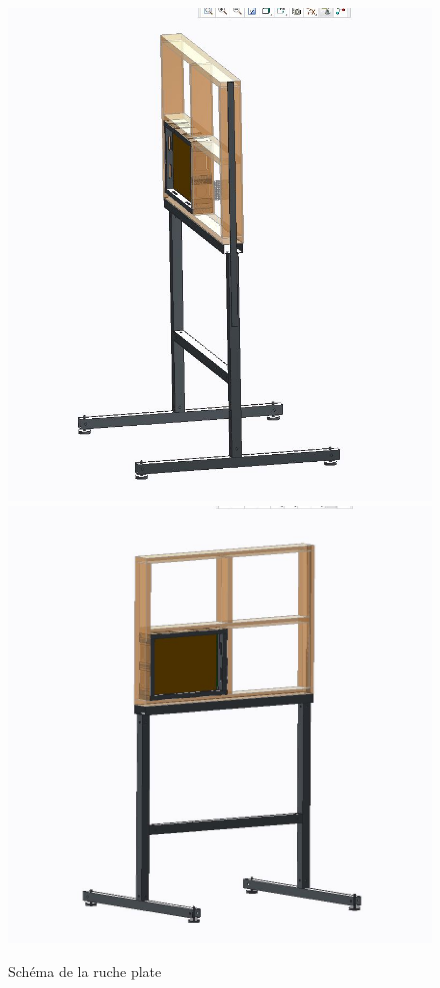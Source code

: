 \documentclass[11pt,french,a4paper]{report}
\begin{document}
\begin{figure}[!h]
\centering
\includegraphics[scale=0.3]{../images/schema_ruche/supportrucheplate1.JPG}
\includegraphics[scale=0.3]{../images/schema_ruche/supportrucheplate.JPG} 
\caption{Schéma de la ruche plate}
\label{schema_conception}
\end{figure}
\end{document}
